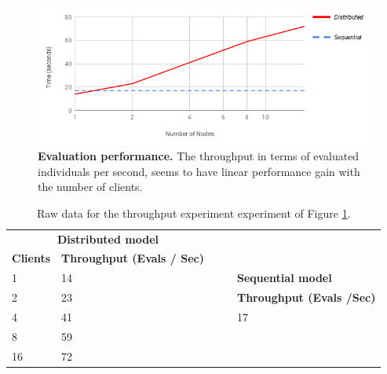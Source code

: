 \begin{figure}[h!]
		\centering
    	\includegraphics[width=\linewidth]{assets/images/experiment-evaluations-second.png}
    	\caption{\textbf{Evaluation performance.} The throughput in terms of evaluated individuals per second, seems to have linear performance gain with the number of clients.}
    	\label{fig:evaluations_experiment}
\end{figure}

\begin{table}[h!]
\begin{tabular}{|l|l|lll}
\cline{1-2}
\multicolumn{2}{|c|}{\textbf{Distributed model}}                          &           &                       & \textbf{}                                             \\ \cline{1-2}
\textbf{Clients} & \multicolumn{1}{c|}{\textbf{Throughput (Evals / Sec)}} &           &                       & \textbf{}                                             \\ \cline{1-2} \cline{5-5} 
1                & 14                                                     & \textbf{} & \multicolumn{1}{l|}{} & \multicolumn{1}{l|}{\textbf{Sequential model}}        \\ \cline{1-2} \cline{5-5} 
2                & 23                                                     &           & \multicolumn{1}{l|}{} & \multicolumn{1}{l|}{\textbf{Throughput (Evals /Sec)}} \\ \cline{1-2} \cline{5-5} 
4                & 41                                                     &           & \multicolumn{1}{l|}{} & \multicolumn{1}{l|}{17}                               \\ \cline{1-2} \cline{5-5} 
8                & 59                                                     &           &                       &                                                       \\ \cline{1-2}
16               & 72                                                     &           &                       &                                                       \\ \cline{1-2}
\end{tabular}
\caption{Raw data for the throughput experiment experiment of Figure \ref{fig:evaluations_experiment}.}
\label{tab:evaluations_experiment}
\end{table}


